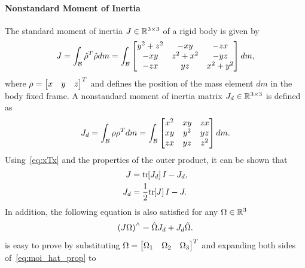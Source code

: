 \paragraph{Nonstandard Moment of Inertia}\label{sec:nonstandard_moi}
The standard moment of inertia \( J \in \mathbb{R}^{3 \times 3} \) of a rigid body is given by
\begin{align}\label{eq:standard_moment_of_inertia}
    J = \int_{\mathcal{B}} \hat{\rho}^T \hat{\rho} dm 
    = \int_{\mathcal{B}}  
    \begin{bmatrix} 
        y^2 + z^2 & -xy & -zx \\
        -xy & z^2 + x^2 & -yz \\
        -zx & yz & x^2 + y^2
    \end{bmatrix} dm, 
\end{align}
where \( \rho = \begin{bmatrix} x & y & z \end{bmatrix}^T\) and defines the position of the mass element \( dm \) in the body fixed frame.
A nonstandard moment of inertia matrix \( J_d \in \mathbb{R}^{3 \times 3 } \) is defined as
\begin{align} \label{eq:nonstandard_moment_of_inertia}
    J_d = \int_{\mathcal{B}} \rho \rho^T dm = \int_{\mathcal{B}} 
    \begin{bmatrix}
        x^2 & xy & zx \\
        xy & y^2 & yz \\
        zx & yz & z^2
    \end{bmatrix} dm.
\end{align}
Using~\cref{eq:xTx} and the properties of the outer product, it can be shown that
\begin{subequations}\label{eq:moi_transformation}
    \begin{align}
        J &= \mathrm{tr}\negthickspace\left[ J_d \right] I - J_d, \label{eq:moi_ns2s}\\
        J_d &= \frac{1}{2} \mathrm{tr}\negthickspace\left[ J \right] I - J.\label{eq:moi_s2ns}
    \end{align}
\end{subequations}     
In addition, the following equation is also satisfied for any \( \Omega \in \mathbb{R}^3 \)
\begin{align}\label{eq:moi_hat_prop}
    \left( J \Omega \right)^\wedge = \hat{\Omega} J_d + J_d \hat{\Omega}.
\end{align}
 is easy to prove by substituting \( \Omega = \begin{bmatrix} \Omega_1 & \Omega_2 & \Omega_3 \end{bmatrix}^T \) and expanding both sides of~\cref{eq:moi_hat_prop} to
